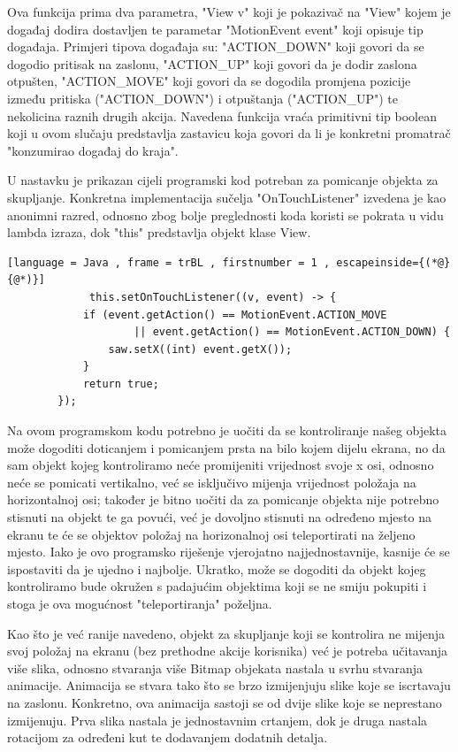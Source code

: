 \documentclass[times, utf8, zavrsni]{fer}
\begin{document}
	Ova funkcija prima dva parametra, "View v" koji je pokazivač na "View" kojem je događaj dodira dostavljen te parametar "MotionEvent event" koji opisuje tip događaja. Primjeri tipova događaja su: 
	"ACTION\_DOWN" koji govori da se dogodio pritisak na zaslonu, "ACTION\_UP" koji govori da je dodir zaslona otpušten, "ACTION\_MOVE" koji govori da se dogodila promjena pozicije između pritiska ("ACTION\_DOWN") i otpuštanja
	("ACTION\_UP") te nekolicina raznih drugih akcija. Navedena funkcija vraća primitivni tip boolean koji u ovom slučaju predstavlja zastavicu koja govori da li je konkretni promatrač "konzumirao događaj do kraja".
	
	U nastavku je prikazan cijeli programski kod potreban za pomicanje objekta za skupljanje. Konkretna implementacija sučelja "OnTouchListener" izvedena je kao anonimni razred, odnosno zbog bolje preglednosti koda 
	koristi se pokrata u vidu lambda izraza, dok "this" predstavlja objekt klase View.

		\begin{lstlisting}[language = Java , frame = trBL , firstnumber = 1 , escapeinside={(*@}{@*)}]
			 this.setOnTouchListener((v, event) -> {
            if (event.getAction() == MotionEvent.ACTION_MOVE 
					|| event.getAction() == MotionEvent.ACTION_DOWN) {
                saw.setX((int) event.getX());
            }
            return true;
        });
		\end{lstlisting}
		
	Na ovom programskom kodu potrebno je uočiti da se kontroliranje našeg objekta može dogoditi doticanjem i pomicanjem prsta na bilo kojem dijelu ekrana, no da sam objekt kojeg kontroliramo neće promijeniti 
	vrijednost svoje x osi, odnosno neće se pomicati vertikalno, već se isključivo mijenja vrijednost položaja na horizontalnoj osi; također je bitno uočiti da za pomicanje objekta nije potrebno stisnuti na objekt
	te ga povući, već je dovoljno stisnuti na određeno mjesto na ekranu te će se objektov položaj na horizonalnoj osi teleportirati na željeno mjesto. Iako je ovo programsko riješenje vjerojatno najjednostavnije, 
	kasnije će se ispostaviti da je ujedno i najbolje. Ukratko, može se dogoditi da objekt kojeg kontroliramo bude okružen s padajućim objektima koji se ne smiju pokupiti i stoga je ova mogućnost "teleportiranja" poželjna.
	
	
	Kao što je već ranije navedeno, objekt za skupljanje koji se kontrolira ne mijenja svoj položaj na ekranu (bez prethodne akcije korisnika) već je potreba učitavanja više slika, odnosno stvaranja više Bitmap 
	objekata nastala u svrhu stvaranja animacije. Animacija se stvara tako što se brzo izmijenjuju slike koje se iscrtavaju na zaslonu. Konkretno, ova animacija sastoji se od dvije slike koje se neprestano izmijenuju.
	Prva slika nastala je jednostavnim crtanjem, dok je druga nastala rotacijom za određeni kut te dodavanjem dodatnih detalja. 
	
\end{document}
